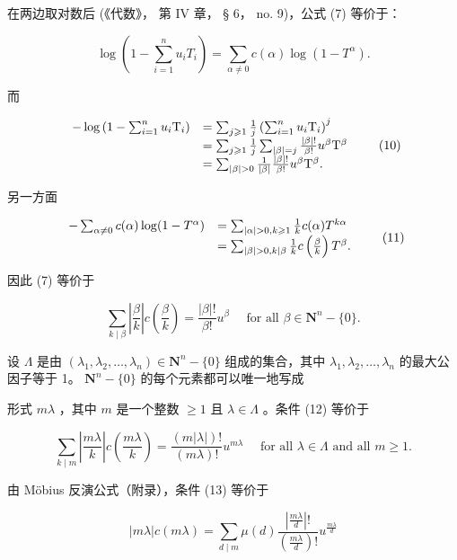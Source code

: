 在两边取对数后 (《代数》， 第 IV 章， § 6， no. 9)，公式 (7) 等价于：

\[
\log \left(1 - \sum_ {i = 1} ^ {n} u _ {i} T _ {i}\right) = \sum_ {\alpha \neq 0} c (\alpha) \log (1 - T ^ {\alpha}).\tag{9}
\]

而

\[
\begin{array}{r l} - \log \left(1 - \sum_ {i = 1} ^ {n} u _ {i} \mathrm{T} _ {i}\right) & = \sum_ {j \geqslant 1} \frac {1}{j} \left(\sum_ {i = 1} ^ {n} u _ {i} \mathrm{T} _ {i}\right) ^ {j} \\ & = \sum_ {j \geqslant 1} \frac {1}{j} \sum_ {| \beta | = j} \frac {| \beta | !}{\beta !} u ^ {\beta} \mathrm{T} ^ {\beta} \\ & = \sum_ {| \beta | > 0} \frac {1}{| \beta |} \frac {| \beta | !}{\beta !} u ^ {\beta} \mathrm{T} ^ {\beta}. \end{array}\tag{10}
\]

另一方面

\[
\begin{array}{r l} - \sum_ {\alpha \neq 0} c (\alpha) \log (1 - T ^ {\alpha}) & = \sum_ {| \alpha | > 0, k \geqslant 1} \frac {1}{k} c (\alpha) T ^ {k \alpha} \\ & = \sum_ {| \beta | > 0, k | \beta} \frac {1}{k} c \left(\frac {\beta}{k}\right) T ^ {\beta}. \end{array}\tag{11}
\]

因此 (7) 等价于

\[
\sum_ {k \mid \beta} \left| \frac {\beta}{k} \right| c \left(\frac {\beta}{k}\right) = \frac {| \beta | !}{\beta !} u ^ {\beta} \quad \text { for   all } \beta \in \mathbf {N} ^ {n} - \{0 \}.\tag{12}
\]

设 \(\Lambda\) 是由 \((\lambda_1, \lambda_2, \ldots, \lambda_n) \in \mathbf{N}^n - \{0\}\) 组成的集合，其中 \(\lambda_1, \lambda_2, \ldots, \lambda_n\) 的最大公因子等于 1。 \(\mathbf{N}^n - \{0\}\) 的每个元素都可以唯一地写成

形式 \(m\lambda\) ，其中 \(m\) 是一个整数 \(\geqslant 1\) 且 \(\lambda \in \Lambda\) 。条件 (12) 等价于

\[
\sum_ {k \mid m} \left| \frac {m \lambda}{k} \right| c \left(\frac {m \lambda}{k}\right) = \frac {(m | \lambda |) !}{(m \lambda) !} u ^ {m \lambda} \quad \text { for   all } \lambda \in \Lambda \text { and   all } m \geqslant 1.\tag{13}
\]

由 Möbius 反演公式（附录），条件 (13) 等价于

\[
\left| m \lambda \right| c (m \lambda) = \sum_ {d \mid m} \mu (d) \frac {\left| \frac {m \lambda}{d} \right| !}{\left(\frac {m \lambda}{d}\right) !} u ^ {\frac {m \lambda}{d}}\tag{14}
\]

